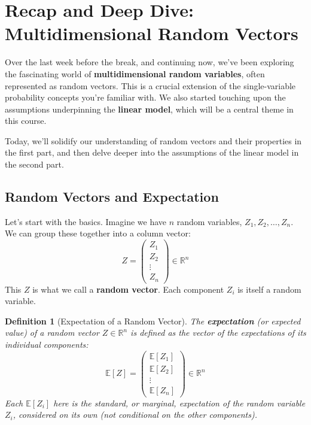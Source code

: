 \documentclass[11pt]{article}
\newtheorem{definition}[theorem]{Definition}
\theoremstyle{definition}
\newcommand{\R}{\mathbb{R}} %
\newcommand{\E}{\mathbb{E}} %
\begin{document}
\section{Recap and Deep Dive: Multidimensional Random Vectors}
\label{sec:random_vectors}

Over the last week before the break, and continuing now, we've been exploring the fascinating world of \textbf{multidimensional random variables}, often represented as random vectors. This is a crucial extension of the single-variable probability concepts you're familiar with. We also started touching upon the assumptions underpinning the \textbf{linear model}, which will be a central theme in this course.

Today, we'll solidify our understanding of random vectors and their properties in the first part, and then delve deeper into the assumptions of the linear model in the second part.

\subsection{Random Vectors and Expectation}
\label{subsec:vec_expectation}

Let's start with the basics. Imagine we have $n$ random variables, $Z_1, Z_2, \ldots, Z_n$. We can group these together into a column vector:
\[
Z = \begin{pmatrix} Z_1 \\ Z_2 \\ \vdots \\ Z_n \end{pmatrix} \in \R^n
\]
This $Z$ is what we call a \textbf{random vector}. Each component $Z_i$ is itself a random variable.

\begin{definition}[Expectation of a Random Vector]
\label{def:vec_expectation}
The \textbf{expectation} (or expected value) of a random vector $Z \in \R^n$ is defined as the vector of the expectations of its individual components:
\[
\E[Z] = \begin{pmatrix} \E[Z_1] \\ \E[Z_2] \\ \vdots \\ \E[Z_n] \end{pmatrix} \in \R^n
\]
Each $\E[Z_i]$ here is the standard, or \textit{marginal}, expectation of the random variable $Z_i$, considered on its own (not conditional on the other components).
\end{definition}
\end{document}
